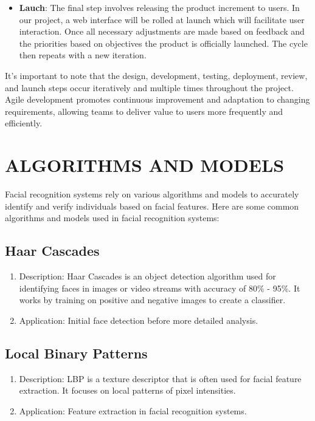 \begin{itemize}
  \item \textbf{Lauch}:
        The final step involves releasing the product increment to users. In our project, a web interface will be rolled at launch which will facilitate user interaction.
        Once all necessary adjustments are made based on feedback and the priorities based on objectives the product is officially launched. The cycle then repeats with a new iteration.\\
\end{itemize}

It's important to note that the design, development, testing, deployment, review, and launch steps occur iteratively and multiple times throughout the project. Agile development promotes continuous improvement and adaptation to changing requirements, allowing teams to deliver value to users more frequently and efficiently.\\
 \section{ALGORITHMS AND MODELS}        
Facial recognition systems rely on various algorithms and models to accurately identify and verify individuals based on facial features. Here are some common algorithms and models used in facial recognition systems:

\subsection{Haar Cascades}
\begin{enumerate}
    \item Description: Haar Cascades is an object detection algorithm used for identifying faces in images or video streams with accuracy of 80\% - 95\%. It works by training on positive and negative images to create a classifier.
\item Application: Initial face detection before more detailed analysis.
\end{enumerate}

 \subsection{Local Binary Patterns }
   \begin{enumerate}
           \item Description: LBP is a texture descriptor that is often used for facial feature extraction. It focuses on local patterns of pixel intensities.
\item Application: Feature extraction in facial recognition systems.

   \end{enumerate}

